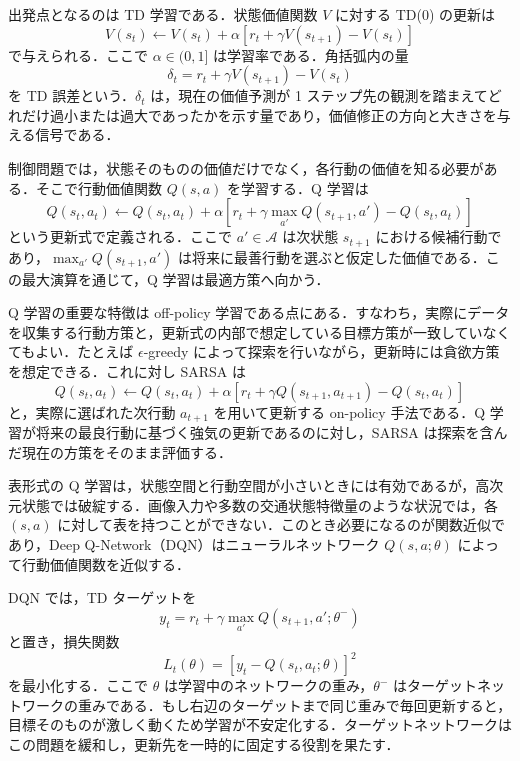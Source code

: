 出発点となるのは TD 学習である．状態価値関数 $V$ に対する TD(0) の更新は
\begin{equation}
V(s_t)
\leftarrow
V(s_t) + \alpha
\left[
r_t + \gamma V(s_{t+1}) - V(s_t)
\right]
\end{equation}
で与えられる．ここで $\alpha \in (0,1]$ は学習率である．角括弧内の量
\begin{equation}
\delta_t = r_t + \gamma V(s_{t+1}) - V(s_t)
\end{equation}
を TD 誤差という．$\delta_t$ は，現在の価値予測が 1 ステップ先の観測を踏まえてどれだけ過小または過大であったかを示す量であり，価値修正の方向と大きさを与える信号である．

制御問題では，状態そのものの価値だけでなく，各行動の価値を知る必要がある．そこで行動価値関数 $Q(s,a)$ を学習する．Q 学習は
\begin{equation}
Q(s_t,a_t) \leftarrow Q(s_t,a_t) + \alpha \left[r_t + \gamma \max_{a'} Q(s_{t+1},a') - Q(s_t,a_t)\right]
\end{equation}
という更新式で定義される\cite{WatkinsDayan1992}．ここで $a' \in \mathcal{A}$ は次状態 $s_{t+1}$ における候補行動であり，$\max_{a'} Q(s_{t+1},a')$ は将来に最善行動を選ぶと仮定した価値である．この最大演算を通じて，Q 学習は最適方策へ向かう．

Q 学習の重要な特徴は off-policy 学習である点にある．すなわち，実際にデータを収集する行動方策と，更新式の内部で想定している目標方策が一致していなくてもよい．たとえば $\epsilon$-greedy によって探索を行いながら，更新時には貪欲方策を想定できる．これに対し SARSA は
\begin{equation}
Q(s_t,a_t)
\leftarrow
Q(s_t,a_t) + \alpha
\left[
r_t + \gamma Q(s_{t+1},a_{t+1}) - Q(s_t,a_t)
\right]
\end{equation}
と，実際に選ばれた次行動 $a_{t+1}$ を用いて更新する on-policy 手法である．Q 学習が将来の最良行動に基づく強気の更新であるのに対し，SARSA は探索を含んだ現在の方策をそのまま評価する．

表形式の Q 学習は，状態空間と行動空間が小さいときには有効であるが，高次元状態では破綻する．画像入力や多数の交通状態特徴量のような状況では，各 $(s,a)$ に対して表を持つことができない．このとき必要になるのが関数近似であり，Deep Q-Network（DQN）はニューラルネットワーク $Q(s,a;\theta)$ によって行動価値関数を近似する\cite{Mnih2015}．

DQN では，TD ターゲットを
\begin{equation}
y_t = r_t + \gamma \max_{a'} Q(s_{t+1},a';\theta^-)
\end{equation}
と置き，損失関数
\begin{equation}
L_t(\theta)
=
\left[
y_t - Q(s_t,a_t;\theta)
\right]^2
\end{equation}
を最小化する．ここで $\theta$ は学習中のネットワークの重み，$\theta^-$ はターゲットネットワークの重みである．もし右辺のターゲットまで同じ重みで毎回更新すると，目標そのものが激しく動くため学習が不安定化する．ターゲットネットワークはこの問題を緩和し，更新先を一時的に固定する役割を果たす．

